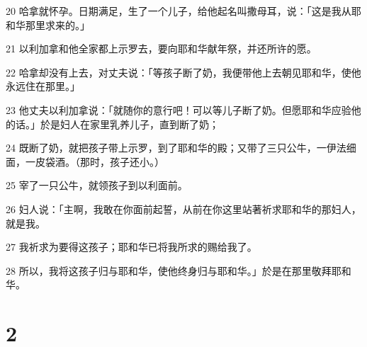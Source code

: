 \par 20 哈拿就怀孕。日期满足，生了一个儿子，给他起名叫撒母耳，说：「这是我从耶和华那里求来的。」
\par 21 以利加拿和他全家都上示罗去，要向耶和华献年祭，并还所许的愿。
\par 22 哈拿却没有上去，对丈夫说：「等孩子断了奶，我便带他上去朝见耶和华，使他永远住在那里。」
\par 23 他丈夫以利加拿说：「就随你的意行吧！可以等儿子断了奶。但愿耶和华应验他的话。」於是妇人在家里乳养儿子，直到断了奶；
\par 24 既断了奶，就把孩子带上示罗，到了耶和华的殿；又带了三只公牛，一伊法细面，一皮袋酒。（那时，孩子还小。）
\par 25 宰了一只公牛，就领孩子到以利面前。
\par 26 妇人说：「主啊，我敢在你面前起誓，从前在你这里站著祈求耶和华的那妇人，就是我。
\par 27 我祈求为要得这孩子；耶和华已将我所求的赐给我了。
\par 28 所以，我将这孩子归与耶和华，使他终身归与耶和华。」於是在那里敬拜耶和华。

\chapter{2}

